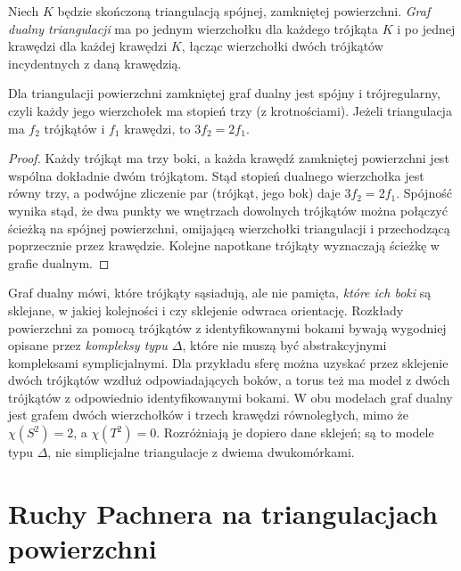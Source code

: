 \begin{definicja}
Niech $K$ będzie skończoną triangulacją spójnej,
zamkniętej powierzchni. \emph{Graf dualny triangulacji}
ma po jednym wierzchołku dla każdego trójkąta $K$
i po jednej krawędzi dla każdej krawędzi $K$, łącząc
wierzchołki dwóch trójkątów incydentnych z daną krawędzią.
\end{definicja}

\begin{stwierdzenie}
Dla triangulacji powierzchni zamkniętej graf dualny jest
spójny i trójregularny, czyli każdy jego wierzchołek ma
stopień trzy (z krotnościami). Jeżeli triangulacja ma
$f_2$ trójkątów i $f_1$ krawędzi, to
$3f_2=2f_1$.
\end{stwierdzenie}

\begin{proof}
Każdy trójkąt ma trzy boki, a każda krawędź zamkniętej
powierzchni jest wspólna dokładnie dwóm trójkątom.
Stąd stopień dualnego wierzchołka jest równy trzy,
a podwójne zliczenie par (trójkąt, jego bok) daje
$3f_2=2f_1$. Spójność wynika stąd, że dwa punkty we
wnętrzach dowolnych trójkątów można połączyć ścieżką
na spójnej powierzchni, omijającą wierzchołki triangulacji
i przechodzącą poprzecznie przez krawędzie. Kolejne
napotkane trójkąty wyznaczają ścieżkę w grafie dualnym.
\end{proof}

\begin{uwaga}
Graf dualny mówi, które trójkąty sąsiadują, ale nie pamięta,
\emph{które ich boki} są sklejane, w jakiej kolejności i czy
sklejenie odwraca orientację. Rozkłady powierzchni za pomocą
trójkątów z identyfikowanymi bokami bywają wygodniej opisane
przez \emph{kompleksy typu $\Delta$}, które nie muszą być
abstrakcyjnymi kompleksami symplicjalnymi. Dla przykładu
sferę można uzyskać przez sklejenie dwóch trójkątów wzdłuż
odpowiadających boków, a torus też ma model z dwóch
trójkątów z odpowiednio identyfikowanymi bokami. W obu
modelach graf dualny jest grafem dwóch wierzchołków
i trzech krawędzi równoległych, mimo że
$\chi(S^2)=2$, a $\chi(T^2)=0$. Rozróżniają je dopiero
dane sklejeń; są to modele typu $\Delta$, nie simplicjalne
triangulacje z dwiema dwukomórkami.
\end{uwaga}

\section{Ruchy Pachnera na triangulacjach powierzchni}
\label{sec:tg-pachner}

